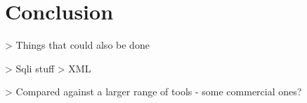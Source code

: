 \chapter{Conclusion}


> Things that could also be done

	> Sqli stuff
	> XML
	
> Compared against a larger range of tools - some commercial ones?

